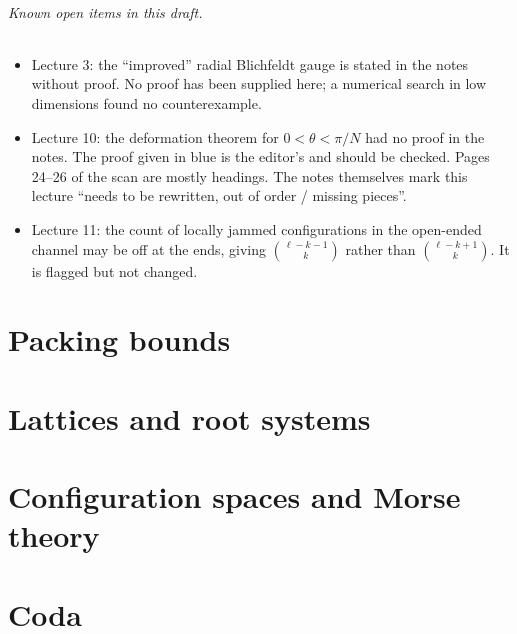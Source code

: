 \paragraph{Known open items in this draft.}
\begin{itemize}
\item Lecture 3: the ``improved'' radial Blichfeldt gauge is stated in the notes without proof. No proof
  has been supplied here; a numerical search in low dimensions found no counterexample.
\item Lecture 10: the deformation theorem for $0<\theta<\pi/N$ had no proof in the notes. The proof given
  in blue is the editor's and should be checked. Pages 24--26 of the scan are mostly headings.
  The notes themselves mark this lecture ``needs to be rewritten, out of order / missing pieces''.
\item Lecture 11: the count of locally jammed configurations in the open-ended channel may be off at the
  ends, giving $\binom{\ell-k-1}{k}$ rather than $\binom{\ell-k+1}{k}$. It is flagged but not changed.
\end{itemize}

\tableofcontents



\mainmatter
\part{Packing bounds}




\part{Lattices and root systems}



\begingroup\renewcommand{\thechapter}{A}\renewcommand{\theHchapter}{interludeA}

\endgroup
\begingroup\renewcommand{\thechapter}{B}\renewcommand{\theHchapter}{interludeB}

\endgroup
\begingroup\renewcommand{\thechapter}{C}\renewcommand{\theHchapter}{interludeC}

\endgroup
\setcounter{chapter}{6}

\part{Configuration spaces and Morse theory}



\begingroup\renewcommand{\thechapter}{D}\renewcommand{\theHchapter}{interludeD}

\endgroup
\begingroup\renewcommand{\thechapter}{E}\renewcommand{\theHchapter}{interludeE}

\endgroup
\begingroup\renewcommand{\thechapter}{F}\renewcommand{\theHchapter}{interludeF}

\endgroup
\begingroup\renewcommand{\thechapter}{G}\renewcommand{\theHchapter}{interludeG}

\endgroup

\part*{Coda}
\begingroup\renewcommand{\thechapter}{H}\renewcommand{\theHchapter}{interludeH}

\endgroup


